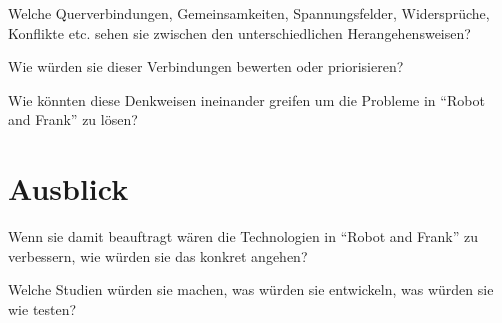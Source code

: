 \documentclass[sigchi-a, authorversion]{acmart}
\begin{document}
Welche Querverbindungen, Gemeinsamkeiten, Spannungsfelder, Widersprüche, Konflikte etc. sehen sie zwischen den unterschiedlichen Herangehensweisen?

Wie würden sie dieser Verbindungen bewerten oder priorisieren?

Wie könnten diese Denkweisen ineinander greifen um die Probleme in ``Robot and Frank'' zu lösen?

\section{Ausblick}

Wenn sie damit beauftragt wären die Technologien in ``Robot and Frank'' zu verbessern, wie würden sie das konkret angehen?

Welche Studien würden sie machen, was würden sie entwickeln, was würden sie wie testen?






\end{document}
